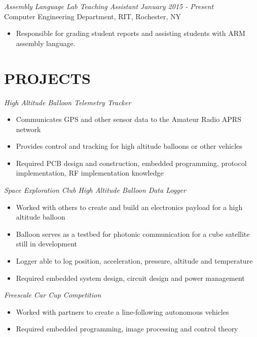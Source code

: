 \documentclass[line,margin]{res}
\begin{document}
\begin{resume}

	\vspace{-5pt}
		{\sl Assembly Language Lab Teaching Assistant } \hfill {\sl January 2015 - Present} \\
		Computer Engineering Department, RIT, Rochester, NY
		\begin{itemize}  \itemsep -2pt %
			\item Responsible for grading student reports and assisting students with ARM assembly language. 
		\end{itemize} 
\section{PROJECTS}
	{\sl High Altitude Balloon Telemetry Tracker }
		\begin{itemize} \itemsep -2pt
			\item Communicates GPS and other sensor data to the Amateur Radio APRS network
			\item Provides control and tracking for high altitude balloons or other vehicles
			\item Required PCB design and construction, embedded programming, protocol implementation, RF implementation knowledge
		\end{itemize}

	\vspace{-10pt}
	{\sl Space Exploration Club High Altitude Balloon Data Logger}
		\begin{itemize} \itemsep -2pt
			\item Worked with others to create and build an electronics payload for a high altitude balloon
			\item Balloon serves as a testbed for photonic communication for a cube satellite still in development 
			\item Logger able to log position, acceleration, pressure, altitude and temperature 
			\item Required embedded system design, circuit design and power management
		\end{itemize}
	\vspace{-10pt}
	{\sl Freescale Car Cup Competition}
		\begin{itemize} \itemsep -2pt
			\item Worked with partners to create a line-following autonomous vehicles
			\item Required embedded programming, image processing and control theory
		\end{itemize}


\end{resume}
\end{document}
